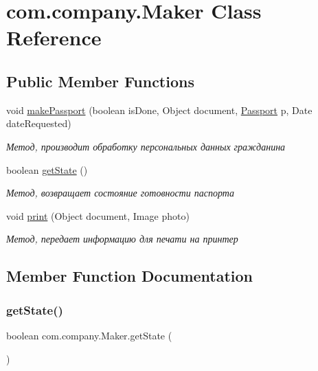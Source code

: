 \hypertarget{classcom_1_1company_1_1Maker}{}\section{com.\+company.\+Maker Class Reference}
\label{classcom_1_1company_1_1Maker}
\subsection*{Public Member Functions}
\begin{DoxyCompactItemize}
\item 
void \mbox{\hyperlink{classcom_1_1company_1_1Maker_ae49e6573e36f57411f1e540e08e1233c}{make\+Passport}} (boolean is\+Done, Object document, \mbox{\hyperlink{classcom_1_1company_1_1Passport}{Passport}} p, Date date\+Requested)
\begin{DoxyCompactList}\small\item\em Метод, производит обработку персональных данных гражданина \end{DoxyCompactList}\item 
boolean \mbox{\hyperlink{classcom_1_1company_1_1Maker_a7c437c450f632d1f4ea5472355a6a07a}{get\+State}} ()
\begin{DoxyCompactList}\small\item\em Метод, возвращает состояние готовности паспорта \end{DoxyCompactList}\item 
void \mbox{\hyperlink{classcom_1_1company_1_1Maker_a3a1841ace89a873596d75277301c8f88}{print}} (Object document, Image photo)
\begin{DoxyCompactList}\small\item\em Метод, передает информацию для печати на принтер \end{DoxyCompactList}\end{DoxyCompactItemize}


\subsection{Member Function Documentation}
\mbox{\label{classcom_1_1company_1_1Maker_a7c437c450f632d1f4ea5472355a6a07a}} 
\subsubsection{\texorpdfstring{get\+State()}{getState()}}
{\footnotesize\ttfamily boolean com.\+company.\+Maker.\+get\+State (\begin{DoxyParamCaption}{ }\end{DoxyParamCaption})\hspace{0.3cm}{\ttfamily [inline]}}



